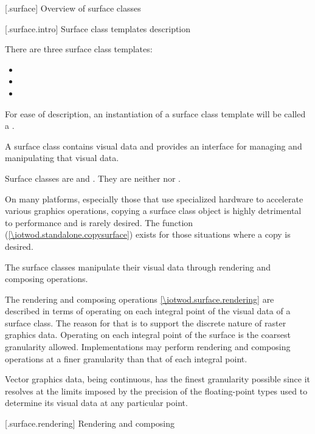  [\iotwod.surface] {Overview of surface classes}

 [\iotwod.surface.intro] {Surface class templates description}

\pnum
{}%
There are three surface class templates:
\begin{itemize}
\item {}
\item {}
\item {}
\end{itemize}

\pnum
For ease of description, an instantiation of a surface class template will be called a .

\pnum
A surface class contains visual data and provides an interface for managing and manipulating that visual data.

\pnum
Surface classes are  and . They are neither  nor . \begin{note}
On many platforms, especially those that use specialized hardware to accelerate various graphics operations, copying a surface class object is highly detrimental to performance and is rarely desired. The  function (\ref{\iotwod.standalone.copysurface}) exists for those situations where a copy is desired.
\end{note}

\pnum
The surface classes manipulate their visual data through rendering and composing operations.

\pnum
The rendering and composing operations \ref{\iotwod.surface.rendering} are described in terms of operating on each integral point of the visual data of a surface class. The reason for that is to support the discrete nature of raster graphics data. Operating on each integral point of the surface is the coarsest granularity allowed. Implementations may perform rendering and composing operations at a finer granularity than that of each integral point.
\begin{note}
Vector graphics data, being continuous, has the finest granularity possible since it resolves at the limits imposed by the precision of the floating-point types used to determine its visual data at any particular point.
\end{note} 

 [\iotwod.surface.rendering] {Rendering and composing}


